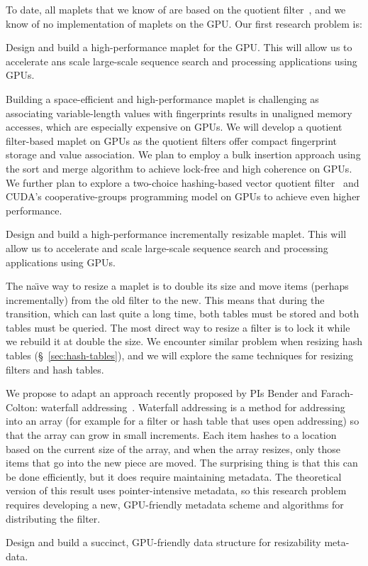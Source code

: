 To date, all maplets that we know of are based on the quotient filter~\cite{conway2020splinterdb,PandeyBJP17,DBLP:journals/pacmmod/ConwayFJ23}, and we know of no implementation of maplets on the GPU\@.
Our first research problem is:

\begin{rproblem}
Design and build a high-performance maplet for the GPU\@. This will allow us to accelerate ans scale large-scale sequence search and \kmer processing applications using GPUs. 
\end{rproblem}

Building a space-efficient and high-performance maplet is challenging as associating variable-length values with fingerprints results in unaligned memory accesses, which are especially expensive on GPUs. We will develop a quotient filter-based maplet on GPUs as the quotient filters offer compact fingerprint storage and value association. We plan to employ a bulk insertion approach using the sort and merge algorithm to achieve lock-free and high coherence on GPUs. We further plan to explore a two-choice hashing-based vector quotient filter~\cite{PandeyCDBFJ21} and CUDA's cooperative-groups programming model on GPUs to achieve even higher performance.

\begin{rproblem}\label{rprob:resizable-maplet}
Design and build a high-performance incrementally resizable maplet. This will allow us to accelerate and scale large-scale sequence search and \kmer processing applications using GPUs.
\end{rproblem}

The na\"\i{}ve way to resize a maplet is to double its size and move items (perhaps incrementally) from the old filter to the new.  This means that during the transition, which can last quite a long time, both tables must be stored and both tables must be queried. The most direct way to resize a filter is to lock it while we rebuild it at double the size.  We encounter similar problem when resizing hash tables (\S~\ref{sec:hash-tables}), and we will explore the same techniques for resizing filters and hash tables.


We propose to adapt an approach recently proposed by PIs Bender and Farach-Colton: waterfall addressing~\cite{Bender2022}.   Waterfall addressing is a method for addressing into an array (for example for a filter or hash table that uses open addressing) so that the array can grow in small increments.  Each item hashes to a location based on the current size of the array, and when the array resizes, only those items that go into the new piece are moved.  The surprising thing is that this can be done efficiently, but it does require maintaining metadata.  The theoretical version of this result uses pointer-intensive metadata, so this research problem requires developing a new, GPU-friendly metadata scheme and algorithms for distributing the filter. \begin{rproblem}\label{rprob:resizable-maplet-metadata}
Design and build a succinct, GPU-friendly data structure for resizability meta-data.
\end{rproblem}

